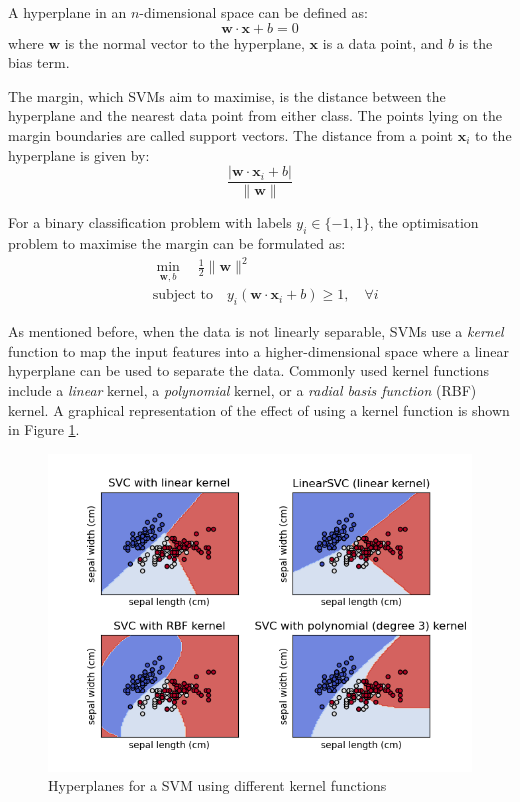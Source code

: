 A hyperplane in an \( n \)-dimensional space can be defined as:
\begin{equation}
	\mathbf{w} \cdot \mathbf{x} + b = 0
\end{equation}
where \( \mathbf{w} \) is the normal vector to the hyperplane, \( \mathbf{x} \) is a data point, and \( b \) is the bias term.

The margin, which SVMs aim to maximise, is the distance between the hyperplane and the nearest data point from either class. The points lying on the margin boundaries are called support vectors. The distance from a point \( \mathbf{x}_i \) to the hyperplane is given by:
\begin{equation}
	\frac{|\mathbf{w} \cdot \mathbf{x}_i + b|}{\|\mathbf{w}\|}
\end{equation}

For a binary classification problem with labels \( y_i \in \{ -1, 1 \} \), the optimisation problem to maximise the margin can be formulated as:
\begin{equation}
	\begin{aligned}
		& \min_{\mathbf{w}, b} \quad \frac{1}{2} \|\mathbf{w}\|^2 \\
		& \text{subject to} \quad y_i (\mathbf{w} \cdot \mathbf{x}_i + b) \geq 1, \quad \forall i
	\end{aligned}
\end{equation}

As mentioned before, when the data is not linearly separable, SVMs use a \textit{kernel} function to map the input features into a higher-dimensional space where a linear hyperplane can be used to separate the data. Commonly used kernel functions include a \textit{linear} kernel, a \textit{polynomial} kernel, or a \textit{radial basis function} (RBF) kernel. A graphical representation of the effect of using a kernel function is shown in Figure \ref{fig:svm}.

\begin{figure}[h]
	\centering
	\includegraphics[width=\textwidth]{Figures/svm.png}
	\caption{Hyperplanes for a SVM using different kernel functions \cite{scikitsvm}}
	\label{fig:svm}
\end{figure}

